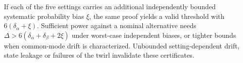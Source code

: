 \documentclass[
  10pt,
  a4paper,
]{article}
\begin{document}
If each of the five settings carries an additional independently bounded systematic probability bias \(\xi\), the same proof yields a valid threshold with \(6(\delta_\alpha+\xi)\). Sufficient power against a nominal alternative needs \(\Delta>6(\delta_\alpha+\delta_\beta+2\xi)\) under worst-case independent biases, or tighter bounds when common-mode drift is characterized. Unbounded setting-dependent drift, state leakage or failures of the twirl invalidate these certificates.
\end{document}
